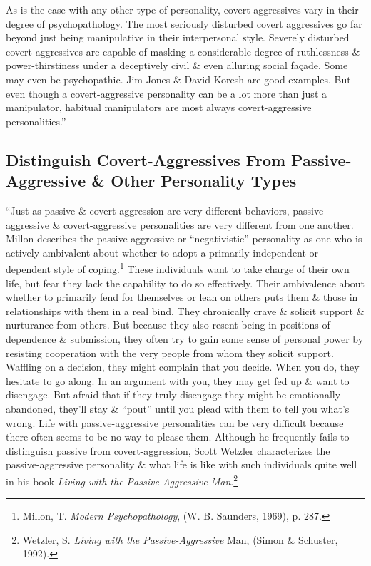 \documentclass{article}
\numberwithin{equation}{section}
\begin{document}
As is the case with any other type of personality, covert-aggressives vary in their degree of psychopathology. The most seriously disturbed covert aggressives go far beyond just being manipulative in their interpersonal style. Severely disturbed covert aggressives are capable of masking a considerable degree of ruthlessness \& power-thirstiness under a deceptively civil \& even alluring social fa\c{c}ade. Some may even be psychopathic. Jim Jones \& David Koresh are good examples. But even though a covert-aggressive personality can be a lot more than just a manipulator, habitual manipulators are most always covert-aggressive personalities.'' -- \cite[pp. 39--41]{Simon2010}

\subsection{Distinguish Covert-Aggressives From Passive-Aggressive \& Other Personality Types}
``Just as passive \& covert-aggression are very different behaviors, passive-aggressive \& covert-aggressive personalities are very different from one another. Millon describes the passive-aggressive or ``negativistic'' personality as one who is actively ambivalent about whether to adopt a primarily independent or dependent style of coping.\footnote{Millon, T. \textit{Modern Psychopathology}, (W. B. Saunders, 1969), p. 287.} These individuals want to take charge of their own life, but fear they lack the capability to do so effectively. Their ambivalence about whether to primarily fend for themselves or lean on others puts them \& those in relationships with them in a real bind. They chronically crave \& solicit support \& nurturance from others. But because they also resent being in positions of dependence \& submission, they often try to gain some sense of personal power by resisting cooperation with the very people from whom they solicit support. Waffling on a decision, they might complain that you decide. When you do, they hesitate to go along. In an argument with you, they may get fed up \& want to disengage. But afraid that if they truly disengage they might be emotionally abandoned, they'll stay \& ``pout'' until you plead with them to tell you what's wrong. Life with passive-aggressive personalities can be very difficult because there often seems to be no way to please them. Although he frequently fails to distinguish passive from covert-aggression, Scott Wetzler characterizes the passive-aggressive personality \& what life is like with such individuals quite well in his book \textit{Living with the Passive-Aggressive Man}.\footnote{Wetzler, S. \textit{Living with the Passive-Aggressive} Man, (Simon \& Schuster, 1992).}
\end{document}
